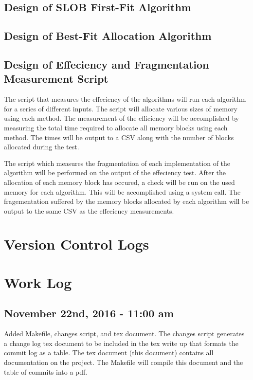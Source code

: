\documentclass[letterpaper,10pt]{article}
\begin{document}
\subsection{Design of SLOB First-Fit Algorithm}
\subsection{Design of Best-Fit Allocation Algorithm}
\subsection{Design of Effeciency and Fragmentation Measurement Script}
The script that measures the effeciency of the algorithms will run each algorithm for a series of 
different inputs. The script will allocate various sizes of memory using each method. The 
measurement of the efficiency will be accomplished by measuring the total time required to allocate 
all memory blocks using each method. The times will be output to a CSV along with the number of 
blocks allocated during the test.

The script which measures the fragmentation of each implementation of the algorithm will be 
performed on the output of the effeciency test. After the allocation of each memory block has 
occured, a check will be run on the used memory for each algorithm. This will be accomplished using 
a system call. The fragementation suffered by the memory blocks allocated by each algorithm will be 
output to the same CSV as the effeciency measurements.

\section{Version Control Logs}


\section{Work Log}
\subsection{November 22nd, 2016 - 11:00 am}
Added Makefile, changes script, and tex document. 
The changes script generates a change log tex document to be included in the tex write up that formats 
the commit log as a table. 
The tex document (this document) contains all documentation on the project. 
The Makefile will compile this document and the table of commits into a pdf.
\end{document}
